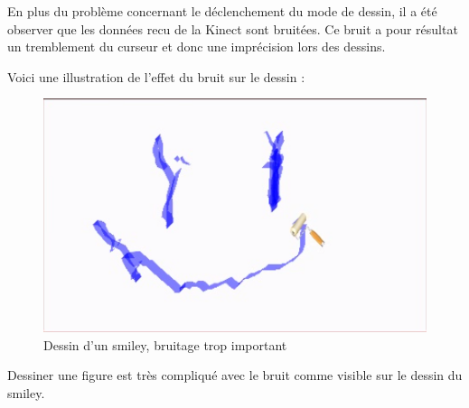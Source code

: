 En plus du problème concernant le déclenchement du mode de dessin, il a été observer que les données recu de la Kinect sont bruitées. Ce bruit a pour résultat un tremblement du curseur et donc une imprécision lors des dessins.

Voici une illustration de l'effet du bruit sur le dessin :


\begin{figure}[!ht]
	\center
	\includegraphics[scale=0.5]{image/bruit.png}
	\caption{Dessin d'un smiley, bruitage trop important}
\end{figure}

Dessiner une figure est très compliqué avec le bruit comme visible sur le dessin du smiley.
 

